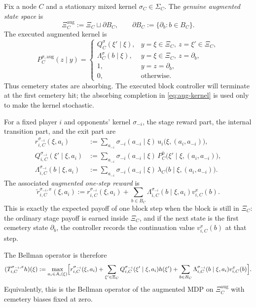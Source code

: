 \documentclass[12pt]{article}
\theoremstyle{definition}
\newcommand{\1}{\mathbf{1}}
\begin{document}
Fix a node $C$ and a stationary mixed kernel $\sigma_C\in\Sigma_C$. The
\emph{genuine augmented state space} is
\[
\Xi_C^{\mathrm{aug}}:=\Xi_C\sqcup \partial B_C,
\qquad
\partial B_C:=\{\partial_b:b\in B_C\}.
\]
The executed augmented kernel is
\begin{equation}
\label{eq:aug-kernel}
P_C^{\sigma,\mathrm{aug}}(z\mid y)
=
\begin{cases}
Q_C^{\sigma}(\xi'\mid \xi), & y=\xi\in\Xi_C,\ z=\xi'\in\Xi_C,\\[0.3em]
\Lambda_C^{\sigma}(b\mid \xi), & y=\xi\in\Xi_C,\ z=\partial_b,\\[0.3em]
1, & y=z=\partial_b,\\[0.3em]
0, & \text{otherwise.}
\end{cases}
\end{equation}
Thus cemetery states are absorbing. The executed block controller will terminate at
the first cemetery hit; the absorbing completion in \eqref{eq:aug-kernel} is used
only to make the kernel stochastic.

For a fixed player $i$ and opponents' kernel $\sigma_{-i}$, the stage reward part,
the internal transition part, and the exit part are
\begin{align}
\label{eq:r-sigma}
r_{i,C}^{\sigma_{-i}}(\xi,a_i)
&:=
\sum_{a_{-i}}\sigma_{-i}(a_{-i}\mid\xi)
\,u_i\bigl(\xi,(a_i,a_{-i})\bigr),
\\
\label{eq:Q-sigma}
Q_{i,C}^{\sigma_{-i}}(\xi'\mid \xi,a_i)
&:=
\sum_{a_{-i}}\sigma_{-i}(a_{-i}\mid\xi)
\,P_C^0\bigl(\xi'\mid\xi,(a_i,a_{-i})\bigr),
\\
\label{eq:q-exit-sigma}
\Lambda_{i,C}^{\sigma_{-i}}(b\mid\xi,a_i)
&:=
\sum_{a_{-i}}\sigma_{-i}(a_{-i}\mid\xi)
\,\lambda_C\bigl(b\mid\xi,(a_i,a_{-i})\bigr).
\end{align}
The associated \emph{augmented one-step reward} is
\begin{equation}
\label{eq:augmented-reward}
\widetilde r_{i,C}^{\sigma_{-i},x}(\xi,a_i)
:=
r_{i,C}^{\sigma_{-i}}(\xi,a_i)
+
\sum_{b\in B_C}\Lambda_{i,C}^{\sigma_{-i}}(b\mid\xi,a_i)v_{i,C}^x(b).
\end{equation}
This is exactly the expected payoff of one block step when the block is still in
$\Xi_C$: the ordinary stage payoff is earned inside $\Xi_C$, and if the next state
is the first cemetery state $\partial_b$, the controller records the continuation
value $v_{i,C}^x(b)$ at that step.

The Bellman operator is therefore
\begin{equation}
\label{eq:Bellman-operator}
(T_{i,C}^{\sigma_{-i},x}h)(\xi)
:=
\max_{a_i\in A_i(\xi)}\Bigl[
 r_{i,C}^{\sigma_{-i}}(\xi,a_i)
 +\sum_{\xi'\in\Xi_C}Q_{i,C}^{\sigma_{-i}}(\xi'\mid\xi,a_i)h(\xi')
 +\sum_{b\in B_C}\Lambda_{i,C}^{\sigma_{-i}}(b\mid\xi,a_i)v_{i,C}^x(b)
 \Bigr].
\end{equation}
Equivalently, this is the Bellman operator of the augmented MDP on
$\Xi_C^{\mathrm{aug}}$ with cemetery biases fixed at zero.
\end{document}
